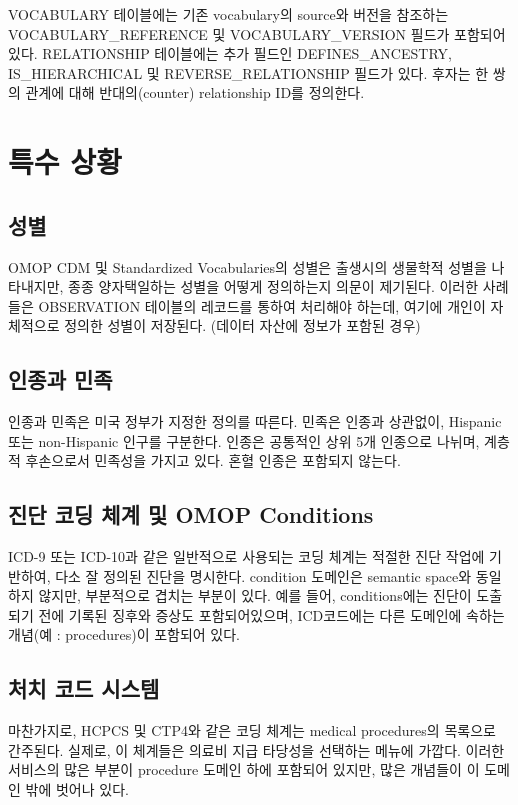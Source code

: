\documentclass[11pt]{book}
\theoremstyle{definition}
\theoremstyle{definition}
\theoremstyle{definition}
\theoremstyle{remark}
\begin{document}
VOCABULARY 테이블에는 기존 vocabulary의 source와 버전을 참조하는
VOCABULARY\_REFERENCE 및 VOCABULARY\_VERSION 필드가 포함되어 있다.
RELATIONSHIP 테이블에는 추가 필드인 DEFINES\_ANCESTRY, IS\_HIERARCHICAL
및 REVERSE\_RELATIONSHIP 필드가 있다. 후자는 한 쌍의 관계에 대해
반대의(counter) relationship ID를 정의한다.

\section{특수 상황}\label{specialSituations}

\subsection{성별}

OMOP CDM 및 Standardized Vocabularies의 성별은 출생시의 생물학적 성별을
나타내지만, 종종 양자택일하는 성별을 어떻게 정의하는지 의문이 제기된다.
이러한 사례들은 OBSERVATION 테이블의 레코드를 통하여 처리해야 하는데,
여기에 개인이 자체적으로 정의한 성별이 저장된다. (데이터 자산에 정보가
포함된 경우)

\subsection{인종과 민족}\label{-}

인종과 민족은 미국 정부가 지정한 정의를 따른다. 민족은 인종과 상관없이,
Hispanic 또는 non-Hispanic 인구를 구분한다. 인종은 공통적인 상위 5개
인종으로 나뉘며, 계층적 후손으로서 민족성을 가지고 있다. 혼혈 인종은
포함되지 않는다.

\subsection{진단 코딩 체계 및 OMOP
Conditions}\label{----omop-conditions}

ICD-9 또는 ICD-10과 같은 일반적으로 사용되는 코딩 체계는 적절한 진단
작업에 기반하여, 다소 잘 정의된 진단을 명시한다. condition 도메인은
semantic space와 동일하지 않지만, 부분적으로 겹치는 부분이 있다. 예를
들어, conditions에는 진단이 도출되기 전에 기록된 징후와 증상도
포함되어있으며, ICD코드에는 다른 도메인에 속하는 개념(예 : procedures)이
포함되어 있다.

\subsection{처치 코드 시스템}\label{--}

마찬가지로, HCPCS 및 CTP4와 같은 코딩 체계는 medical procedures의
목록으로 간주된다. 실제로, 이 체계들은 의료비 지급 타당성을 선택하는
메뉴에 가깝다. 이러한 서비스의 많은 부분이 procedure 도메인 하에
포함되어 있지만, 많은 개념들이 이 도메인 밖에 벗어나 있다.
\end{document}
